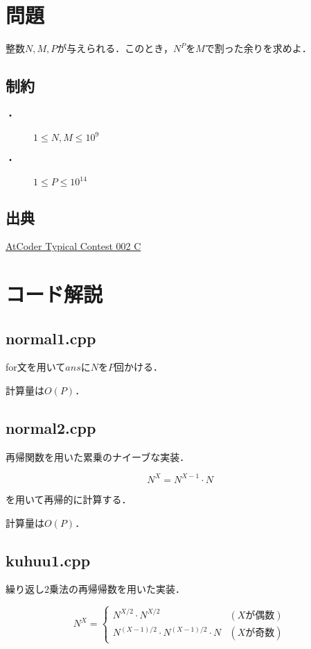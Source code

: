 \documentclass[slide,20pt]{ltjsarticle}
\begin{document}
\section*{問題}
整数$N, M, P$が与えられる．このとき，$N ^ P$を$M$で割った余りを求めよ．

\subsection*{制約}
\begin{description}
\item[・] $1 \leq N, M \leq 10^9$
\item[・] $1 \le P \le 10^{14}$
\end{description}

\subsection*{出典}
\href{https://atcoder.jp/contests/abc169/tasks/abc169_c}{AtCoder Typical Contest 002 C}


\section*{コード解説}
\subsection*{normal1.cpp}
for文を用いて$ans$に$N$を$P$回かける．

計算量は$O(P)$．

\subsection*{normal2.cpp}
再帰関数を用いた累乗のナイーブな実装．

\[ N ^ X = N ^ {X - 1} \cdot N \]

を用いて再帰的に計算する．

計算量は$O(P)$．

\subsection*{kuhuu1.cpp}
繰り返し$2$乗法の再帰帰数を用いた実装．

\begin{equation*}
  N ^ X = \left\{
    \begin{array}{ll}
      N ^ {X / 2} \cdot N ^ {X / 2} & (X \text{が偶数}) \\
      N ^ {(X - 1) / 2} \cdot N ^ {(X - 1) / 2} \cdot N & (X \text{が奇数})
    \end{array}
  \right.
\end{equation*}
\end{document}
